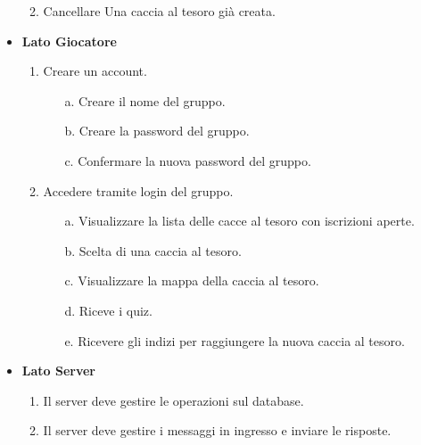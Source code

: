 \documentclass[12pt, italian]{article}
\begin{document}
\begin{itemize}
\begin{enumerate}
\begin{enumerate}
		\end{enumerate}
		\item Cancellare Una caccia al tesoro già creata.
	\end{enumerate}
	\item \textbf{Lato Giocatore}
		\begin{enumerate}
			\item Creare un account.
			\begin{enumerate}
				\item [a.] Creare il nome del gruppo.
				\item [b.] Creare la password del gruppo.
				\item [c.] Confermare la nuova password del gruppo.
			\end{enumerate}
			\item Accedere tramite login del gruppo.
			\begin{enumerate}
				\item [a.] Visualizzare la lista delle cacce al tesoro con iscrizioni aperte.
				\item [b.] Scelta di una caccia al tesoro.
				\item [c.] Visualizzare la mappa della caccia al tesoro.
				\item [d.] Riceve i quiz.
				\item [e.] Ricevere gli indizi per raggiungere la nuova caccia al tesoro.
			\end{enumerate}
		\end{enumerate} 
	\item \textbf{Lato Server}
		\begin{enumerate}
			\item Il server deve gestire le operazioni sul database.
			\item Il server deve gestire i messaggi in ingresso e inviare le risposte.
		\end{enumerate}
\end{itemize}
\end{document}
